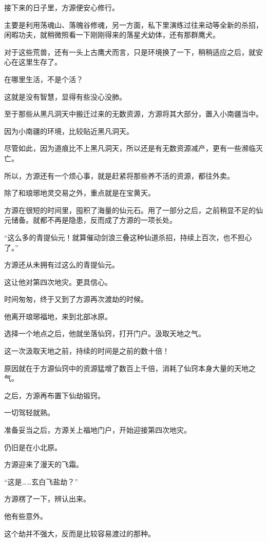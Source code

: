 \begin{this_body}
接下来的日子里，方源便安心修行。

主要是利用荡魂山、落魄谷修魂，另一方面，私下里演练过往来动等全新的杀招，闲暇功夫，就稍微照看一下刚刚得来的落星犬幼体，还有那群鹰犬。

对于这些荒兽，还有一头上古鹰犬而言，只是环境换了一下，稍稍适应之后，就安心在这里生存了。

在哪里生活，不是个活？

这就是没有智慧，显得有些没心没肺。

至于那些从黑凡洞天中搬迁过来的无数资源，方源将其大部分，置入小南疆当中。

因为小南疆的环境，比较贴近黑凡洞天。

尽管如此，因为道痕比不上黑凡洞天，所以还是有无数资源减产，更有一些濒临灭亡。

所以，方源还有一个烦心事，就是赶紧将那些养不活的资源，都往外卖。

除了和琅琊地灵交易之外，重点就是在宝黄天。

方源在很短的时间里，囤积了海量的仙元石。用了一部分之后，之前稍显不足的仙元储备。就都不再是隐患，反而成了方源的一项长处。

“这么多的青提仙元！就算催动剑浪三叠这种仙道杀招，持续上百次，也不担心了。”

方源还从未拥有过这么的青提仙元。

这让他对第四次地灾。更具信心。

时间匆匆，终于又到了方源再次渡劫的时候。

他离开琅琊福地，来到北部冰原。

选择一个地点之后，他就坐落仙窍，打开门户。汲取天地之气。

这一次汲取天地之前，持续的时间是之前的数十倍！

原因就在于方源仙窍中的资源猛增了数百上千倍，消耗了仙窍本身大量的天地之气。

之后，方源再布置下仙劫锻窍。

一切驾轻就熟。

准备妥当之后，方源关上福地门户，开始迎接第四次地灾。

仍旧是在小北原。

方源迎来了漫天的飞霜。

“这是……玄白飞盐劫？”

方源楞了一下，辨认出来。

他有些意外。

这个劫并不强大，反而是比较容易渡过的那种。


\end{this_body}

